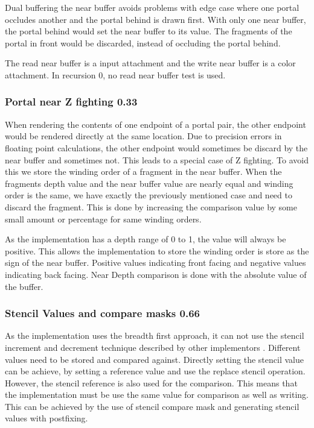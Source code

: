 Dual buffering the near buffer avoids problems with edge case where one portal occludes another and the portal behind is drawn first. With only one near buffer, the portal behind would set the near buffer to its value. The fragments of the portal in front would be discarded, instead of occluding the portal behind.

The read near buffer is a input attachment and the write near buffer is a color attachment. In recursion 0, no read near buffer test is used.

\subsubsection{Portal near Z fighting 0.33}
When rendering the contents of one endpoint of a portal pair, the other endpoint would be rendered directly at the same location. Due to precision errors in floating point calculations, the other endpoint would sometimes be discard by the near buffer and sometimes not. This leads to a special case of Z fighting. To avoid this we store the winding order of a fragment in the near buffer. When the fragments depth value and the near buffer value are nearly equal and winding order is the same, we have exactly the previously mentioned case and need to discard the fragment. This is done by increasing the comparison value by some small amount or percentage for same winding orders.

As the implementation has a depth range of 0 to 1, the value will always be positive. This allows the implementation to store the winding order is store as the sign of the near buffer. Positive values indicating front facing and negative values indicating back facing. Near Depth comparison is done with the absolute value of the buffer.

\subsubsection{Stencil Values and compare masks 0.66}
\label{section:stencilcomparemasks}

As the implementation uses the breadth first approach, it can not use the stencil increment and decrement technique described by other implementors \cite{schmalstieg:1999:sewing, lowe:2003:fragment, lecture:portalProblems}. Different values need to be stored and compared against. Directly setting the stencil value can be achieve, by setting a reference value and use the replace stencil operation. However, the stencil reference is also used for the comparison. This means that the implementation must be use the same value for comparison as well as writing. This can be achieved by the use of stencil compare mask and generating stencil values with postfixing.

